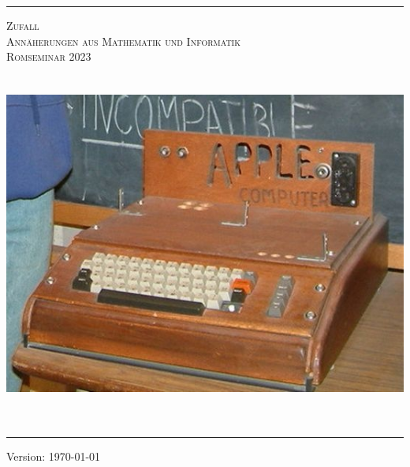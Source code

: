 \begin{titlepage}
\begin{center}
\end{center}
\pagebreak
\vspace{2cm}
\thispagestyle{empty}
\newcommand{\HRule}{\rule{\linewidth}{.25mm}}
	\HRule
	\vspace*{10pt}
	\begin{center}
	{\scshape {\Huge Zufall} \\[.5em ]
	  {\Large Annäherungen aus Mathematik und Informatik} \\[5mm]
				{\large Romseminar 2023} \\ }
	\vspace*{15pt}
	\includegraphics[width=14cm, height=12cm, keepaspectratio=true]{./content/gruppenbild}
	\vspace*{10pt}	  
	\end{center}
	\HRule
	\begin{center}
	  {Version: \today }
	\end{center}
\end{titlepage}
